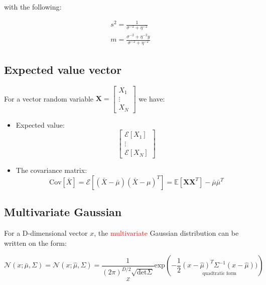     with the following:

    \begin{equation}
    \begin{aligned}
        s^{2} = \frac{1} {\sigma^{-2}+ \eta^{-2}} \\
        m = \frac{\sigma^{-2} + \eta^{-2}y} {\sigma^{-2} + \eta^{-2}}  
    \end{aligned}
    \end{equation}

    \subsection*{Expected value vector}
    For a vector random variable $\textbf{X} = \begin{bmatrix} X_1 \\  \vdots \\ X_N \end{bmatrix}$ we have:
    
    \begin{itemize}
        \item Expected value: \\
        \begin{equation}
            \begin{bmatrix} \mathcal{E}[X_1] \\ \vdots \\ \mathcal{E}[X_N] \end{bmatrix}
        \end{equation}
        \item The covariance matrix: \\
        \begin{equation}
            \text{Cov} [\bar{X}] = \mathcal{E}[(\bar{X}- \bar{\mu})(\bar{X}-\mu)^{T}] = \mathbb{E}[\textbf{XX}^{T}] - \bar{\mu}\bar{\mu}^{T}
        \end{equation}
    \end{itemize}

\subsection*{Multivariate Gaussian}
For a D-dimensional vector $x$, the \textcolor{red}{multivariate} Gaussian distribution can be written on the form:

\begin{equation}
    \mathcal{N} (x; \bar{\mu}, \Sigma ) = \mathcal{N}(x; \hat{\mu}, \Sigma) =  \underset{Z}{\frac{1} {(2\pi)^{D/2} \sqrt{{\text{det}\Sigma}}}} \text{exp} \left( -\frac{1} {2} \underset{\text{quadtratic form}}{(x- \hat{\mu})^{T} \Sigma^{-1}(x-\hat{\mu}))}  \right) 
\end{equation}

